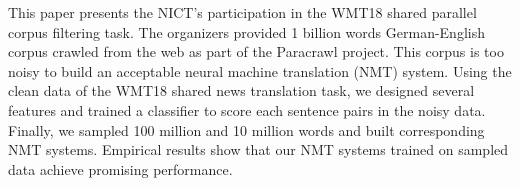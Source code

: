 This paper presents the NICT's participation in the WMT18 shared parallel corpus filtering task.  The organizers provided 1 billion words German-English corpus crawled from the web as part of the Paracrawl project. This corpus is too noisy to build an acceptable neural machine translation (NMT) system. Using the clean data of the WMT18 shared news translation task, we designed several features and trained a classifier to score each sentence pairs in the noisy data. Finally, we sampled 100 million and 10 million words and built corresponding NMT systems. Empirical results show that our NMT systems trained on sampled data achieve promising performance.
